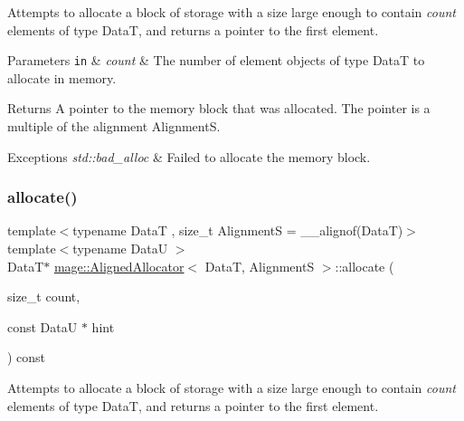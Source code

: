 Attempts to allocate a block of storage with a size large enough to contain {\itshape count} elements of type {\ttfamily DataT}, and returns a pointer to the first element.


\begin{DoxyParams}[1]{Parameters}
\mbox{\tt in}  & {\em count} & The number of element objects of type {\ttfamily DataT} to allocate in memory. \\
\hline
\end{DoxyParams}
\begin{DoxyReturn}{Returns}
A pointer to the memory block that was allocated. The pointer is a multiple of the alignment {\ttfamily AlignmentS}. 
\end{DoxyReturn}

\begin{DoxyExceptions}{Exceptions}
{\em std\+::bad\+\_\+alloc} & Failed to allocate the memory block. \\
\hline
\end{DoxyExceptions}
\hypertarget{structmage_1_1_aligned_allocator_ae7369bc87b8720a0433f8ceda2a52218}{}\label{structmage_1_1_aligned_allocator_ae7369bc87b8720a0433f8ceda2a52218} 
\subsubsection{\texorpdfstring{allocate()}{allocate()}\hspace{0.1cm}{\footnotesize\ttfamily [2/2]}}
{\footnotesize\ttfamily template$<$typename DataT , size\+\_\+t AlignmentS = \+\_\+\+\_\+alignof(\+Data\+T)$>$ \\
template$<$typename DataU $>$ \\
DataT$\ast$ \hyperlink{structmage_1_1_aligned_allocator}{mage\+::\+Aligned\+Allocator}$<$ DataT, AlignmentS $>$\+::allocate (\begin{DoxyParamCaption}\item[{size\+\_\+t}]{count,  }\item[{const DataU $\ast$}]{hint }\end{DoxyParamCaption}) const}

Attempts to allocate a block of storage with a size large enough to contain {\itshape count} elements of type {\ttfamily DataT}, and returns a pointer to the first element.


